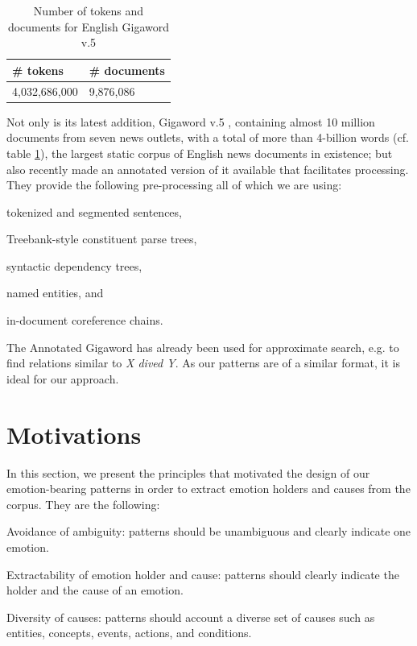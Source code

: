 \begin{table}[h]
\centering
\begin{tabular}{l|l}
{\bf \# tokens} & {\bf \# documents}\\\hline
4,032,686,000   & 9,876,086
\end{tabular}
\caption{Number of tokens and documents for English Gigaword v.5}
\label{tab:gigaword}
\end{table}

Not only is its latest addition, Gigaword v.5 \cite{gigaword}, containing almost 10 million documents from seven news outlets, with a total of more than 4-billion words (cf. table \ref{tab:gigaword}), the largest static corpus of English news documents in existence; but also \citeauthor{annotated_gigaword} recently made an annotated version of it available that facilitates processing. They provide the following pre-processing all of which we are using:

\begin{aenumerate}
	\item tokenized and segmented sentences,
	\item Treebank-style constituent parse trees,
	\item syntactic dependency trees,
	\item named entities, and
	\item in-document coreference chains.
\end{aenumerate}

The Annotated Gigaword has already been used for approximate search, e.g. to find relations similar to \textit{X dived Y}. As our patterns are of a similar format, it is ideal for our approach.

\section{Motivations} \label{sec:motivations}

In this section, we present the principles that motivated the design of our emotion-bearing patterns in order to extract emotion holders and causes from the corpus. They are the following:

\begin{aenumerate}
	\item Avoidance of ambiguity: patterns should be unambiguous and clearly indicate one emotion. 
	\item Extractability of emotion holder and cause: patterns should clearly indicate the holder and the cause of an emotion.
	\item Diversity of causes: patterns should account a diverse set of causes such as entities, concepts, events, actions, and conditions.
\end{aenumerate}

